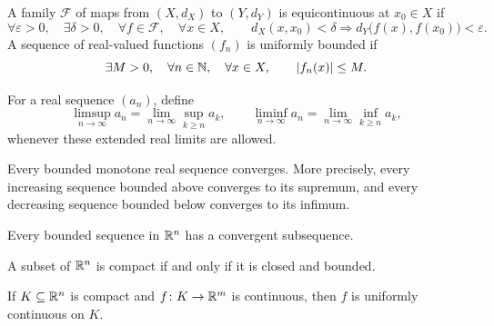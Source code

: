     \begin{definition}
        A family $\mathcal{F}$ of maps from $(X,d_X)$ to $(Y,d_Y)$ is
        equicontinuous at $x_0\in X$ if
        \[
            \forall\varepsilon>0,
            \quad
            \exists\delta>0,
            \quad
            \forall f\in\mathcal{F},
            \quad
            \forall x\in X,
            \qquad
            d_X(x,x_0)<\delta
            \Rightarrow
            d_Y\bigl(f(x),f(x_0)\bigr)<\varepsilon.
        \]
        A sequence of real-valued functions $(f_n)$ is uniformly bounded if
        \[
            \exists M>0,
            \quad
            \forall n\in\mathbb{N},
            \quad
            \forall x\in X,
            \qquad
            |f_n(x)|\leq M.
        \]
    \end{definition}

    \begin{definition}
        For a real sequence $(a_n)$, define
        \[
            \limsup_{n\to\infty} a_n
            =
            \lim\limits_{n\to\infty}\sup_{k\geq n} a_k,
            \qquad
            \liminf_{n\to\infty} a_n
            =
            \lim\limits_{n\to\infty}\inf_{k\geq n} a_k,
        \]
        whenever these extended real limits are allowed.
    \end{definition}

    \begin{theorem}
        Every bounded monotone real sequence converges. More precisely, every
        increasing sequence bounded above converges to its supremum, and every
        decreasing sequence bounded below converges to its infimum.
    \end{theorem}

    \begin{theorem}
        Every bounded sequence in $\mathbb{R}^n$ has a convergent subsequence.
    \end{theorem}

    \begin{theorem}
        A subset of $\mathbb{R}^n$ is compact if and only if it is closed and bounded.
    \end{theorem}

    \begin{theorem}
        If $K\subseteq\mathbb{R}^n$ is compact and $f\colon K\to\mathbb{R}^m$ is continuous, then $f$
        is uniformly continuous on $K$.
    \end{theorem}

